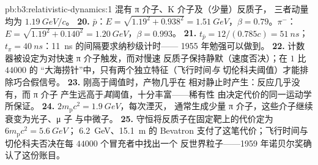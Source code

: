 \begin{solution}{pb:b3:relativistic-dynamics:1}
混有 π 介子、K 介子及（少量）反质子，
三者动量均为 $\qty{1.19}{GeV}/c$。
\textbf{20.} $\bar p$：$E = \sqrt{1.19^2 + 0.938^2} =
\qty{1.51}{GeV}$，$\beta = 0.79$。$\pi^-$：$E = \sqrt{1.19^2 +
0.140^2} = \qty{1.20}{GeV}$，$\beta = 0.993$。
\textbf{21.} $t_{\bar p} = 12/(0.785c) = \qty{51}{ns}$；$t_\pi =
\qty{40}{ns}$：\qty{11}{ns} 的间隔要求纳秒级计时——
1955 年勉强可以做到。
\textbf{22.} 计数器被设定为对快速 π 介子触发，而对慢速
反质子保持静默（速度否决）；在 $1$ 比 $44000$ 的
“大海捞针”中，只有两个独立特征（飞行时间\emph{与}
切伦科夫阈值）才能排除巧合假信号。
\textbf{23.} 刚高于阈值时，产物几乎在
相对静止时产生：反应几乎没有，而 π 介子
产生远高于\emph{其}阈值，十分丰富——稀有性
由决定代价的同一运动学所保证。
\textbf{24.} $2m_{\text{p}}c^2 = \qty{1.9}{GeV}$，每次湮灭，
通常生成少量 π 介子，这些介子继续衰变为光子、μ 子
与中微子。
\textbf{25.} 守恒将反质子在固定靶上的代价定为
$6m_{\text{p}}c^2 = \qty{5.6}{GeV}$；
\qty{6.2}{GeV}、\qty{15.1}{m} 的 Bevatron 支付了这笔代价；飞行时间与
切伦科夫否决在每 $44000$ 个冒充者中找出一个
反世界粒子——1959 年诺贝尔奖确认了这份账目。
\end{solution}
